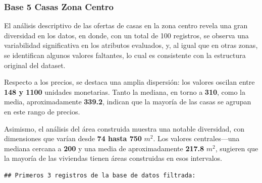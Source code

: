 \documentclass[
]{article}
\begin{document}
\subsubsection{\texorpdfstring{\textbf{Base 5 Casas Zona
Centro}}{Base 5 Casas Zona Centro}}\label{base-5-casas-zona-centro}

El análisis descriptivo de las ofertas de casas en la zona centro revela
una gran diversidad en los datos, en donde, con un total de 100
registros, se observa una variabilidad significativa en los atributos
evaluados, y, al igual que en otras zonas, se identifican algunos
valores faltantes, lo cual es consistente con la estructura original del
dataset.

Respecto a los precios, se destaca una amplia dispersión: los valores
oscilan entre \textbf{148 y 1100} unidades monetarias. Tanto la mediana,
en torno a \textbf{310}, como la media, aproximadamente \textbf{339.2},
indican que la mayoría de las casas se agrupan en este rango de precios.

Asimismo, el análisis del área construida muestra una notable
diversidad, con dimensiones que varían desde \textbf{74 hasta 750}
\(m^2\). Los valores centrales---una mediana cercana a \textbf{200} y
una media de aproximadamente \textbf{217.8} \(m^2\), sugieren que la
mayoría de las viviendas tienen áreas construidas en esos intervalos.

\begin{verbatim}
## Primeros 3 registros de la base de datos filtrada:
\end{verbatim}
\end{document}
